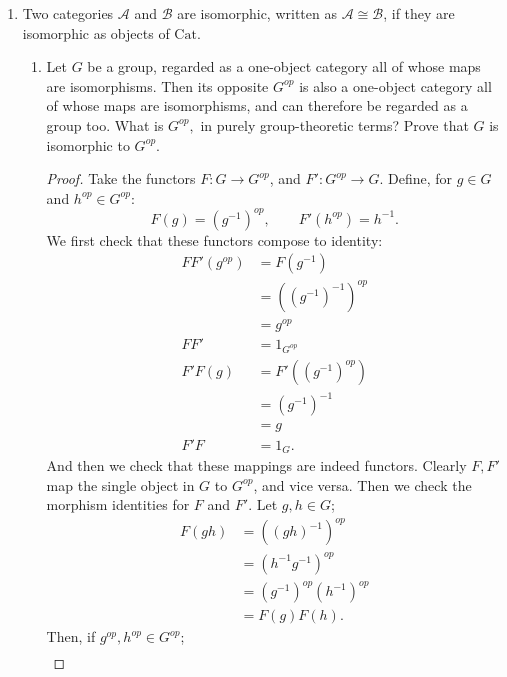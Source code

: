 \documentclass{article}
\begin{document}
\begin{enumerate}
    \item Two categories $\mathscr{A}$ and $\mathscr{B}$ are isomorphic, written as $\mathscr{A}\cong \mathscr{B}$, if they are isomorphic as objects of $\mathrm{Cat}$.
        \begin{enumerate}
            \item Let $G$ be a group, regarded as a one-object category all of whose maps are isomorphisms. Then its opposite $G^{op}$ is also a one-object category all of whose maps are isomorphisms, and can therefore be regarded as a group too. What is $G^{op},$ in purely group-theoretic terms? Prove that $G$ is isomorphic to $G^{op}$.
                \begin{proof} 
                Take the functors $F:G\to G^{op}$, and $F':G^{op}\to G$. Define, for $g\in G$ and $h^{op}\in G^{op}$:
                \[
                F(g)=(g^{-1})^{op},\quad \quad F'(h^{op})=h^{-1}
                .\] 
                We first check that these functors compose to identity:
                \begin{align*}
                    FF'(g^{op})&= F(g^{-1}) \\
                    &= ((g^{-1})^{-1})^{op} \\
                    &= g^{op} \\
                    F F'&= 1_{G^{op}} \\
                    F'F(g)&= F'((g^{-1})^{op} )\\
                    &= (g^{-1})^{-1} \\
                    &= g \\
                    F'F&=1_{G}
                .\end{align*}
                And then we check that these mappings are indeed functors. Clearly $F,F'$ map the single object in $G$ to $G^{op}$, and vice versa. Then we check the morphism identities for $F$ and $F'$. Let $g,h \in G$;
                \begin{align*}
                    F(gh)&= \left( \left( gh \right) ^{-1} \right) ^{op} \\
                    &= \left( h^{-1} g ^{-1} \right) ^{op} \\
                    &= \left( g^{-1} \right)^{op}\left( h^{-1} \right) ^{op} \\
                    &= F(g)F(h)
                .\end{align*}
                Then, if $g^{op},h^{op}\in G^{op}$;
                \begin{align*}

\end{align*}
\end{proof}
\end{enumerate}
\end{enumerate}
\end{document}
